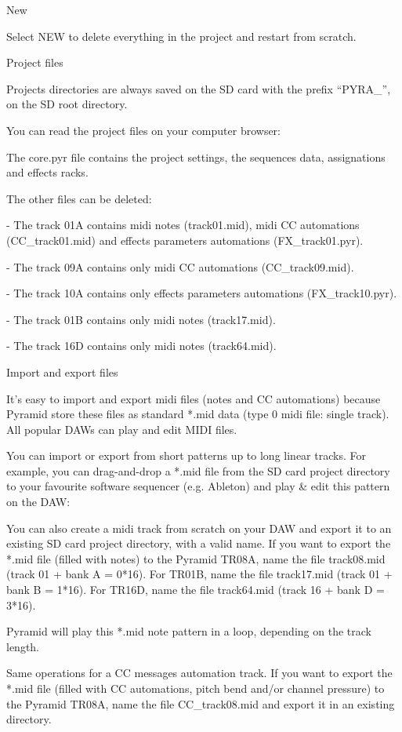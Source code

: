 New

Select NEW to delete everything in the project and restart from scratch.

Project files

Projects directories are always saved on the SD card with the prefix ``PYRA_'', on the SD root directory.

You can read the project files on your computer browser:

The core.pyr file contains the project settings, the sequences data, assignations and effects racks.

The other files can be deleted:

- The track 01A contains midi notes (track01.mid), midi CC automations (CC_track01.mid) and effects parameters automations (FX_track01.pyr).

- The track 09A contains only midi CC automations (CC_track09.mid).

- The track 10A contains only effects parameters automations (FX_track10.pyr).

- The track 01B contains only midi notes (track17.mid).

- The track 16D contains only midi notes (track64.mid).

Import and export files

It's easy to import and export midi files (notes and CC automations) because Pyramid store these files as standard *.mid data (type 0 midi file: single track). All popular DAWs can play and edit MIDI files.

You can import or export from short patterns up to long linear tracks. For example, you can drag-and-drop a *.mid file from the SD card project directory to your favourite software sequencer (e.g. Ableton) and play \& edit this pattern on the DAW:



You can also create a midi track from scratch on your DAW and export it to an existing SD card project directory, with a valid name. If you want to export the *.mid file (filled with notes) to the Pyramid TR08A, name the file track08.mid (track 01 + bank A = 0*16). For TR01B, name the file track17.mid (track 01 + bank B = 1*16). For TR16D, name the file track64.mid (track 16 + bank D = 3*16).

Pyramid will play this *.mid note pattern in a loop, depending on the track length.

Same operations for a CC messages automation track. If you want to export the *.mid file (filled with CC automations, pitch bend and/or channel pressure) to the Pyramid TR08A, name the file CC_track08.mid and export it in an existing directory.
